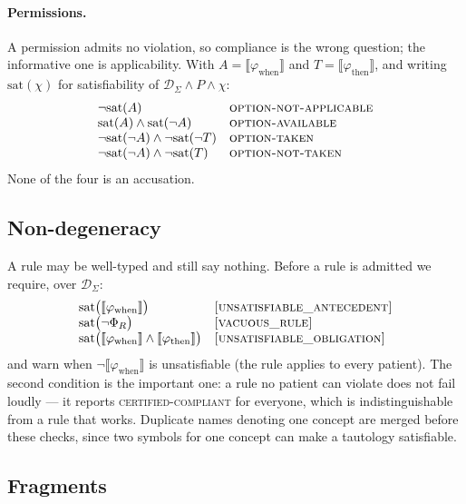 \paragraph{Permissions.} A permission admits no violation, so compliance is the
wrong question; the informative one is applicability. With
$A = \llbracket\varphi_{\mathrm{when}}\rrbracket$ and
$T = \llbracket\varphi_{\mathrm{then}}\rrbracket$, and writing
$\mathrm{sat}(\chi)$ for satisfiability of $\mathcal{D}_\Sigma \wedge P \wedge \chi$:
\[
\begin{array}{ll}
  \neg\mathrm{sat}(A) & \textsc{option-not-applicable} \\
  \mathrm{sat}(A) \wedge \mathrm{sat}(\neg A) & \textsc{option-available} \\
  \neg\mathrm{sat}(\neg A) \wedge \neg\mathrm{sat}(\neg T) & \textsc{option-taken} \\
  \neg\mathrm{sat}(\neg A) \wedge \neg\mathrm{sat}(T) & \textsc{option-not-taken}
\end{array}
\]
None of the four is an accusation.

\subsection{Non-degeneracy}

A rule may be well-typed and still say nothing. Before a rule is admitted we
require, over $\mathcal{D}_\Sigma$:
\[
\begin{array}{ll}
  \mathrm{sat}\bigl(\llbracket\varphi_{\mathrm{when}}\rrbracket\bigr)
    & \textsc{[unsatisfiable\_antecedent]} \\
  \mathrm{sat}\bigl(\neg\Phi_R\bigr)
    & \textsc{[vacuous\_rule]} \\
  \mathrm{sat}\bigl(\llbracket\varphi_{\mathrm{when}}\rrbracket \wedge
                    \llbracket\varphi_{\mathrm{then}}\rrbracket\bigr)
    & \textsc{[unsatisfiable\_obligation]}
\end{array}
\]
and warn when $\neg\llbracket\varphi_{\mathrm{when}}\rrbracket$ is unsatisfiable
(the rule applies to every patient). The second condition is the important one:
a rule no patient can violate does not fail loudly --- it reports
\textsc{certified-compliant} for everyone, which is indistinguishable from a
rule that works. Duplicate names denoting one concept are merged before these
checks, since two symbols for one concept can make a tautology satisfiable.

\subsection{Fragments}
\label{sec:fragments}

